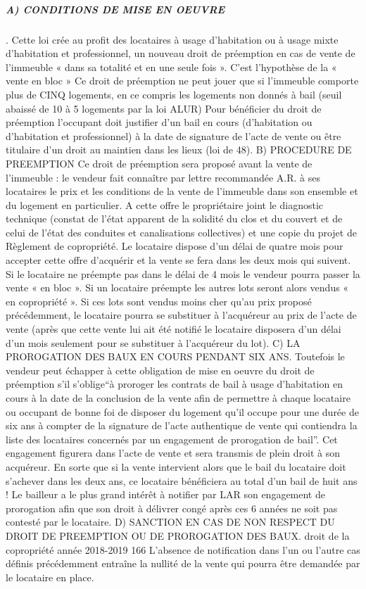 			\subparagraph{A) CONDITIONS DE MISE EN OEUVRE}.
			Cette loi crée au profit des locataires à usage d'habitation ou à usage mixte d'habitation et professionnel,
			un nouveau droit de préemption en cas de vente de l’immeuble « dans sa totalité et en une seule fois ».
			C’est l’hypothèse de la « vente en bloc »
			Ce droit de préemption ne peut jouer que si l’immeuble comporte plus de CINQ logements, en ce compris
			les logements non donnés à bail (seuil abaissé de 10 à 5 logements par la loi ALUR)
			Pour bénéficier du droit de préemption l’occupant doit justifier d’un bail en cours (d’habitation ou
			d’habitation et professionnel) à la date de signature de l’acte de vente ou être titulaire d’un droit au
			maintien dans les lieux (loi de 48).
			B) PROCEDURE DE PREEMPTION
			Ce droit de préemption sera proposé avant la vente de l’immeuble : le vendeur fait connaître par lettre
			recommandée A.R. à ses locataires le prix et les conditions de la vente de l’immeuble dans son ensemble
			et du logement en particulier. A cette offre le propriétaire joint le diagnostic technique (constat de l'état
			apparent de la solidité du clos et du couvert et de celui de l'état des conduites et canalisations collectives)
			et une copie du projet de Règlement de copropriété.
			Le locataire dispose d’un délai de quatre mois pour accepter cette offre d’acquérir et la vente se fera dans
			les deux mois qui suivent.
			Si le locataire ne préempte pas dans le délai de 4 mois le vendeur pourra passer la vente « en bloc ».
			Si un locataire préempte les autres lots seront alors vendus « en copropriété ». Si ces lots sont vendus
			moins cher qu’au prix proposé précédemment, le locataire pourra se substituer à l’acquéreur au prix de
			l’acte de vente (après que cette vente lui ait été notifié le locataire disposera d’un délai d’un mois
			seulement pour se substituer à l’acquéreur du lot).
			C) LA PROROGATION DES BAUX EN COURS PENDANT SIX ANS.
			Toutefois le vendeur peut échapper à cette obligation de mise en oeuvre du droit de préemption s’il
			s’oblige“à proroger les contrats de bail à usage d'habitation en cours à la date de la conclusion de la vente
			afin de permettre à chaque locataire ou occupant de bonne foi de disposer du logement qu'il occupe pour
			une durée de six ans à compter de la signature de l'acte authentique de vente qui contiendra la liste des
			locataires concernés par un engagement de prorogation de bail”. Cet engagement figurera dans l’acte de
			vente et sera transmis de plein droit à son acquéreur.
			En sorte que si la vente intervient alors que le bail du locataire doit s’achever dans les deux ans, ce locataire
			bénéficiera au total d’un bail de huit ans !
			Le bailleur a le plus grand intérêt à notifier par LAR son engagement de prorogation afin que son droit à
			délivrer congé après ces 6 années ne soit pas contesté par le locataire.
			D) SANCTION EN CAS DE NON RESPECT DU DROIT DE PREEMPTION OU DE PROROGATION
			DES BAUX.
			droit de la copropriété année 2018-2019
			166
			L’absence de notification dans l’un ou l’autre cas définis précédemment entraîne la nullité de la vente qui
			pourra être demandée par le locataire en place.
		
